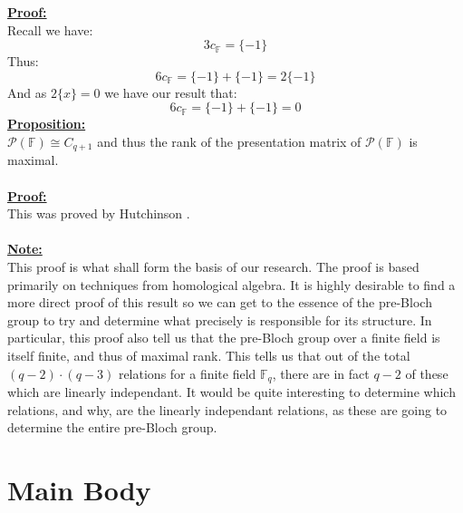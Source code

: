 \documentclass[11pt]{article}
\theoremstyle{plain}
\theoremstyle{definition}
\begin{document}
\textbf{\underline{Proof:}}\\
Recall we have:
\begin{equation*}
	3 c_{\mathbb{F}} = \{-1\} 
\end{equation*}
Thus:
\begin{equation*}
6 c_{\mathbb{F}} = \{-1\} + \{-1\} = 2 \{-1\} 
\end{equation*}
And as $2\{x\}=0$ we have our result that:
\begin{equation*}
6 c_{\mathbb{F}} = \{-1\} + \{-1\} = 0
\end{equation*}
\textbf{\underline{Proposition:}}\\ $\mathcal{P}(\mathbb{F}) \cong C_{q+1}$ and thus the rank of the presentation matrix of $\mathcal{P}(\mathbb{F})$ is maximal.\\
\\
\textbf{\underline{Proof:}}\\ This was proved by Hutchinson \cite{1107.0264}. \\
\\
\textbf{\underline{Note:}}\\ This proof is what shall form the basis of our research. The proof is based primarily on techniques from homological algebra. It is highly desirable to find a more direct proof of this result so we can get to the essence of the pre-Bloch group to try and determine what precisely is responsible for its structure. In particular, this proof also tell us that the pre-Bloch group over a finite field is itself finite, and thus of maximal rank. This tells us that out of the total $(q-2)\cdot (q-3)$ relations for a finite field $\mathbb{F}_q$, there are in fact $q-2$ of these which are linearly independant. It would be quite interesting to determine which relations, and why, are the linearly independant relations, as these are going to determine the entire pre-Bloch group.\\

\pagebreak
\section{Main Body}\label{section:Main Body}
\end{document}
